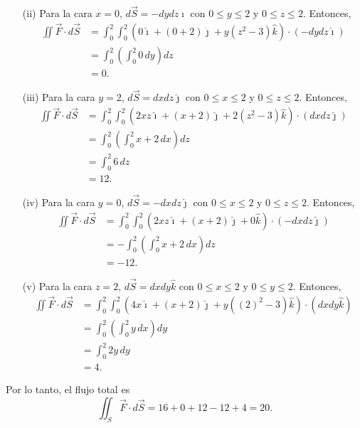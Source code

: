\begin{ejemplo}
\begin{itemize}
        \item[(ii)] Para la cara $x = 0$, $d\Vec{S} = -dydz \hat{\imath}$ con $0 \leq y \leq 2$ y $0 \leq z \leq 2$. Entonces,
        \begin{align*}
             \iint \Vec{F} \cdot d\Vec{S} &= \int_0^2 \int_0^2 (0\hat{\imath} + (0+2) \hat{\jmath} + y(z^2-3) \hat{k}) \cdot (-dydz \hat{\imath})  \\
             &= \int_0^2 \left( \int_0^2 0 \, dy\right) dz\\
             &= 0.
        \end{align*}

        \item[(iii)] Para la cara $y = 2$, $d\Vec{S} = dxdz \hat{\jmath}$ con $0 \leq x \leq 2$ y $0 \leq z \leq 2$. Entonces,
        \begin{align*}
             \iint \Vec{F} \cdot d\Vec{S} &= \int_0^2 \int_0^2 (2xz \hat{\imath} + (x+2) \hat{\jmath} + 2(z^2-3) \hat{k}) \cdot (dxdz \hat{\jmath})  \\
             &= \int_0^2 \left( \int_0^2 x+2 \,dx\right) dz\\
             &=  \int_0^2   6 \, dz \\
             &= 12.
        \end{align*}

        \item[(iv)] Para la cara $y = 0$, $d\Vec{S} = -dxdz \hat{\jmath}$ con $0 \leq x \leq 2$ y $0 \leq z \leq 2$. Entonces,
        \begin{align*}
             \iint \Vec{F} \cdot d\Vec{S} &= \int_0^2 \int_0^2 (2xz \hat{\imath} + (x+2) \hat{\jmath} + 0 \hat{k}) \cdot (-dxdz \hat{\jmath})  \\
             &=- \int_0^2 \left( \int_0^2 x+2 \, dx\right) dz\\
             &=  - 12.
        \end{align*}

        \item[(v)] Para la cara $z = 2$, $d\Vec{S} = dxdy \hat{k}$ con $0 \leq x \leq 2$ y $0 \leq y \leq 2$. Entonces,
        \begin{align*}
             \iint \Vec{F} \cdot d\Vec{S} &= \int_0^2 \int_0^2 (4x \hat{\imath} + (x+2) \hat{\jmath} + y((2)^2-3) \hat{k}) \cdot (dxdy \hat{k})  \\
             &= \int_0^2 \left( \int_0^2 y\, dx\right) dy\\
             &= \int_0^2 2y\,dy \\
             &= 4.
        \end{align*}
    \end{itemize}

    Por lo tanto, el flujo total es
    $$\iint_S \Vec{F} \cdot d\Vec{S} = 16 + 0 + 12 - 12 + 4 = 20.$$
\end{ejemplo}

